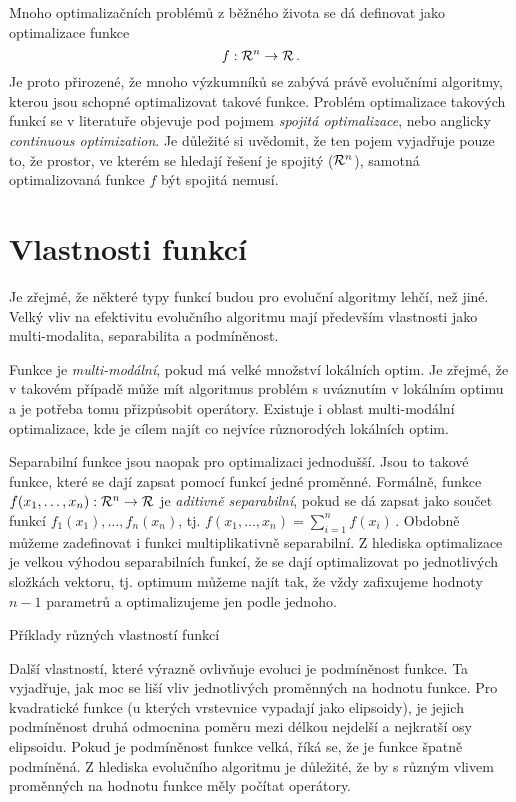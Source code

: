 
Mnoho optimalizačních problémů z běžného života se dá definovat jako optimalizace funkce $$f: {\mathcal{R}}^n \to {\ensuremath{\mathcal{R}}}\,.$$ Je proto přirozené, že mnoho výzkumníků se zabývá právě evolučními algoritmy, kterou jsou schopné optimalizovat takové funkce. Problém optimalizace takových funkcí se v literatuře objevuje pod pojmem \emph{spojitá optimalizace}, nebo anglicky \emph{continuous optimization}. Je důležité si uvědomit, že ten pojem vyjadřuje pouze to, že prostor, ve kterém se hledají řešení je spojitý (${\mathcal{R}}^n$), samotná optimalizovaná funkce $f$ být spojitá nemusí.

\section{Vlastnosti funkcí}

Je zřejmé, že některé typy funkcí budou pro evoluční algoritmy lehčí, než jiné. Velký vliv na efektivitu evolučního algoritmu mají především vlastnosti jako multi-modalita, separabilita a podmíněnost. 

Funkce je \emph{multi-modální}, pokud má velké množství lokálních optim. Je zřejmé, že v takovém případě může mít algoritmus problém s uváznutím v lokálním optimu a je potřeba tomu přizpůsobit operátory. Existuje i oblast multi-modální optimalizace, kde je cílem najít co nejvíce různorodých lokálních optim. 

Separabilní funkce jsou naopak pro optimalizaci jednodušší. Jsou to takové funkce, které se dají zapsat pomocí funkcí jedné proměnné. Formálně, funkce $f(x_1, \dots, x_n): {\mathcal{R}}^n \to {\ensuremath{\mathcal{R}}}$ je \emph{aditivně separabilní}, pokud se dá zapsat jako součet funkcí $f_1(x_1), \dots, f_n(x_n)$, tj. $f(x_1, \dots, x_n)= \sum_{i=1}^n f(x_i)\,.$ Obdobně můžeme zadefinovat i funkci multiplikativně separabilní. Z hlediska optimalizace je velkou výhodou separabilních funkcí, že se dají optimalizovat po jednotlivých složkách vektoru, tj. optimum můžeme najít tak, že vždy zafixujeme hodnoty $n-1$ parametrů a optimalizujeme jen podle jednoho.

\begin{marginfigure}[-4\baselineskip]
\centering

\caption{Příklady různých vlastností funkcí}
\label{fig:function_examples}
\end{marginfigure}

Další vlastností, které výrazně ovlivňuje evoluci je podmíněnost funkce. Ta vyjadřuje, jak moc se liší vliv jednotlivých proměnných na hodnotu funkce. Pro kvadratické funkce (u kterých vrstevnice vypadají jako elipsoidy), je jejich podmíněnost druhá odmocnina poměru mezi délkou nejdelší a nejkratší osy elipsoidu. Pokud je podmíněnost funkce velká, říká se, že je funkce špatně podmíněná. Z hlediska evolučního algoritmu je důležité, že by s různým vlivem proměnných na hodnotu funkce měly počítat operátory.

